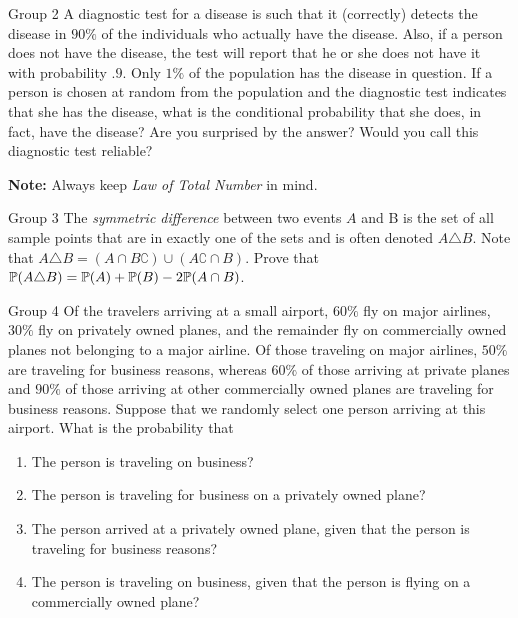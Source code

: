\documentclass{article}
\begin{document}
\begin{problem}
    {Group 2}
    A diagnostic test for a disease is such that it (correctly) detects the  disease in $90\%$ of the individuals who actually have the disease. Also, if a person does not have the disease, the test will report that he or she does not have it with probability $.9$. Only $1\%$ of the population has the disease in question. If a person is chosen at random from the  population and the diagnostic test indicates that she has the disease, what is the conditional probability that she does, in fact, have the disease? Are you surprised by the answer? Would you call this diagnostic test  reliable?

    \textbf{Note:} Always keep \emph{Law of Total Number} in mind.
\end{problem}

\begin{problem}
    {Group 3}
    The \emph{symmetric difference} between two events $A$ and B is the set of all sample points that are in exactly one of the sets and is often denoted $A\triangle B$. Note that $A\triangle B = ( A \cap B\complement) \cup ( A\complement \cap B)$. Prove that $\P{ A \triangle B} = \P{ A } + \P{ B } - 2\P{ A \cap B }$.
\end{problem}

\begin{problem}
    {Group 4}
    Of the travelers arriving at a small airport, $60\%$ fly on major airlines, $30\%$ fly on privately owned planes, and the remainder fly on commercially owned planes not belonging to a major airline. Of those traveling on major airlines, $50\%$ are traveling for business reasons, whereas $60\%$ of those arriving at private planes and $90\%$ of those arriving at other commercially owned planes are traveling for business reasons. Suppose that we randomly select one person arriving at this airport. What is the probability that
    \begin{enumerate}
        \item The person is traveling on business?
        \item The person is traveling for business on a privately owned plane?
        \item The person arrived at a privately owned plane, given that the person is traveling for business reasons?
        \item The person is traveling on business, given that the person is flying on a commercially owned plane?
    \end{enumerate}
\end{problem}
\end{document}
